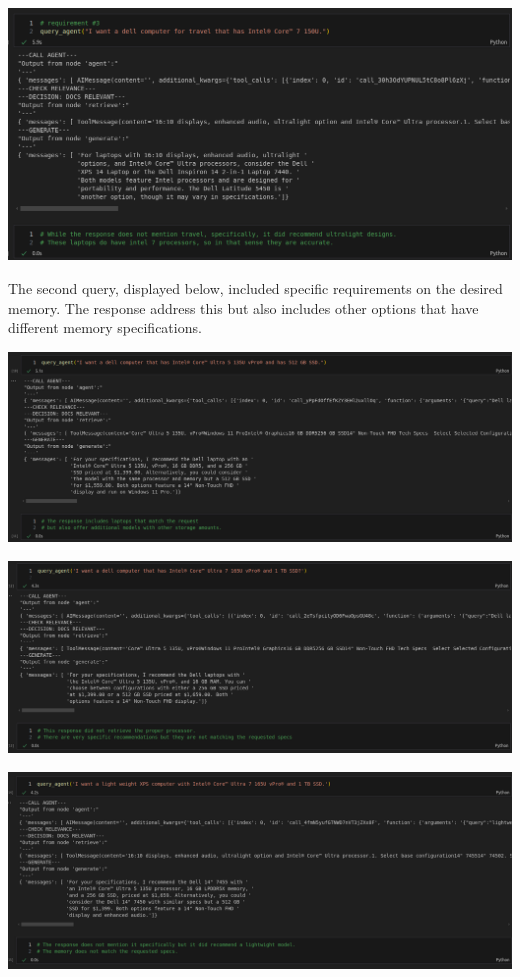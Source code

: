 \documentclass[11pt,letterpaper]{article}
\begin{document}
\begin{center}
    \includegraphics{q1.png}
\end{center}

The second query, displayed below, included specific requirements on the desired memory. The response address this but also includes other options that have different memory specifications. 

\begin{center}
    \includegraphics{q2.png}
\end{center}

\begin{center}
    \includegraphics{q3.png}
\end{center}

\begin{center}
    \includegraphics{q4.png}
\end{center}
\end{document}
